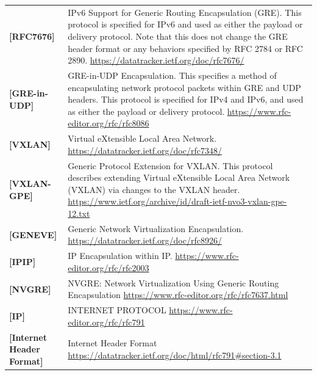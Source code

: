 \begin{longtable}{l p{5in}}
	\label{intro:rfc7676}\textbf{[RFC7676]} &
    IPv6 Support for Generic Routing Encapsulation (GRE). This protocol is specified for IPv6 and used as either the payload or
    delivery protocol. Note that this does not change the GRE header format or any behaviors specified by RFC 2784 or RFC 2890.
	\newline\url{https://datatracker.ietf.org/doc/rfc7676/}\\
	\label{intro:rfc8086}\textbf{[GRE-in-UDP]} &
    GRE-in-UDP Encapsulation. This specifies a method of encapsulating network protocol packets within GRE and UDP headers.
    This protocol is specified for IPv4 and IPv6, and used as either the payload or delivery protocol.
	\newline\url{https://www.rfc-editor.org/rfc/rfc8086}\\
	\label{intro:vxlan}\textbf{[VXLAN]} &
    Virtual eXtensible Local Area Network.
	\newline\url{https://datatracker.ietf.org/doc/rfc7348/}\\
	\label{intro:vxlan-gpe}\textbf{[VXLAN-GPE]} &
    Generic Protocol Extension for VXLAN. This protocol describes extending Virtual eXtensible Local Area Network (VXLAN) via changes to the VXLAN header.
	\newline\url{https://www.ietf.org/archive/id/draft-ietf-nvo3-vxlan-gpe-12.txt}\\
	\label{intro:geneve}\textbf{[GENEVE]} &
    Generic Network Virtualization Encapsulation.
	\newline\url{https://datatracker.ietf.org/doc/rfc8926/}\\
	\label{intro:ipip}\textbf{[IPIP]} &
    IP Encapsulation within IP.
	\newline\url{https://www.rfc-editor.org/rfc/rfc2003}\\
	\label{intro:nvgre}\textbf{[NVGRE]} &
    NVGRE: Network Virtualization Using Generic Routing Encapsulation
	\newline\url{https://www.rfc-editor.org/rfc/rfc7637.html}\\
	\label{intro:IP}\textbf{[IP]} &
    INTERNET PROTOCOL
	\newline\url{https://www.rfc-editor.org/rfc/rfc791}\\
	\label{intro:Internet-Header-Format}\textbf{[Internet Header Format]} &
    Internet Header Format
	\newline\url{https://datatracker.ietf.org/doc/html/rfc791#section-3.1}\\

\end{longtable}

